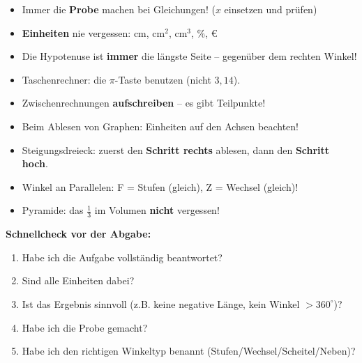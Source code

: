 \documentclass[12pt, a4paper]{article}
\begin{document}
\vspace{0.6cm}
\begin{tipbox}
\begin{itemize}
  \item Immer die \textbf{Probe} machen bei Gleichungen! ($x$ einsetzen und pr\"ufen)
  \item \textbf{Einheiten} nie vergessen: cm, cm$^2$, cm$^3$, \%, \euro
  \item Die Hypotenuse ist \textbf{immer} die l\"angste Seite -- gegen\"uber dem rechten Winkel!
  \item Taschenrechner: die $\pi$-Taste benutzen (nicht $3{,}14$).
  \item Zwischenrechnungen \textbf{aufschreiben} -- es gibt Teilpunkte!
  \item Beim Ablesen von Graphen: Einheiten auf den Achsen beachten!
  \item Steigungsdreieck: zuerst den \textbf{Schritt rechts} ablesen, dann den \textbf{Schritt hoch}.
  \item Winkel an Parallelen: F = Stufen (gleich), Z = Wechsel (gleich)!
  \item Pyramide: das $\frac{1}{3}$ im Volumen \textbf{nicht} vergessen!
\end{itemize}
\end{tipbox}
\vspace{0.4cm}

\begin{merkbox}
\textbf{Schnellcheck vor der Abgabe:}
\begin{enumerate}
  \item Habe ich die Aufgabe vollst\"andig beantwortet?
  \item Sind alle Einheiten dabei?
  \item Ist das Ergebnis sinnvoll (z.B. keine negative L\"ange, kein Winkel $> 360^\circ$)?
  \item Habe ich die Probe gemacht?
  \item Habe ich den richtigen Winkeltyp benannt (Stufen/Wechsel/Scheitel/Neben)?
\end{enumerate}
\end{merkbox}
\end{document}
